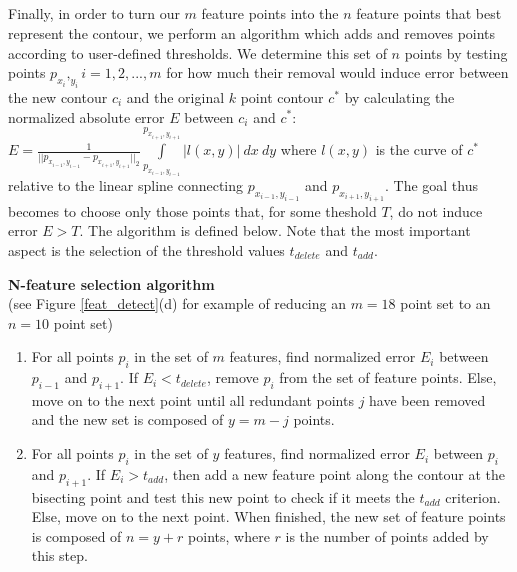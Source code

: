 \documentclass[paper=a4, fontsize=11pt]{scrartcl} %
\begin{document}
\\
\\
\\
\\
Finally, in order to turn our $m$ feature points into the $n$ feature points that best represent the contour, we perform an algorithm which adds and removes points according to user-defined thresholds. We determine this set of $n$ points by testing points $p_{x_i},_{y_i}  i = 1, 2, ..., m$ for how much their removal would induce error between the new contour $c_i$ and the original $k$ point contour $c^*$ by calculating the normalized absolute error $E$ between $c_i$ and $c^*$: $E = \frac{1}{|| p_{x_{i-1},y_{i-1}}  -  p_{x_{i+1},y_{i+1}} ||_2} \int\limits_{p_{x_{i-1},y_{i-1}}}^{p_{x_{i+1},y_{i+1}}} |l(x,y)| \ dx \ dy$ where $l(x,y)$ is the curve of $c^*$ relative to the linear spline connecting $p_{x_{i-1},y_{i-1}}$ and $p_{x_{i+1},y_{i+1}}$. The goal thus becomes to choose only those points that, for some theshold $T$, do not induce error $E > T$. The algorithm is defined below. Note that the most important aspect is the selection of the threshold values $t_{delete}$ and $t_{add}$. 

\textbf{N-feature selection algorithm}
\\
(see Figure \ref{feat_detect}(d) for example of reducing an $m = 18$ point set to an $n = 10$ point set)
\begin{enumerate}
	\item 
	For all points $p_i$ in the set of $m$ features, find normalized error $E_i$ between $p_{i-1}$ and $p_{i+1}$. If $E_i < t_{delete}$, remove $p_i$ from the set of feature points. Else, move on to the next point until all redundant points $j$ have been removed and the new set is composed of $y = m - j$ points.  
	\item
	For all points $p_i$ in the set of $y$ features, find normalized error $E_i$ between $p_{i}$ and $p_{i+1}$. If $E_i > t_{add}$, then add a new feature point along the contour at the bisecting point and test this new point to check if it meets the $t_{add}$ criterion. Else, move on to the next point. When finished, the new set of feature points is composed of $n = y + r$ points, where $r$ is the number of points added by this step. 
\end{enumerate}
\end{document}
